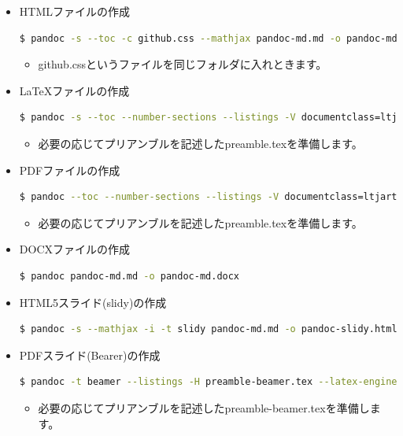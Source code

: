 \documentclass[]{ltjarticle}
\begin{document}
\begin{itemize}
\item
  HTMLファイルの作成

\begin{lstlisting}[language=bash]
$ pandoc -s --toc -c github.css --mathjax pandoc-md.md -o pandoc-md.html
\end{lstlisting}

  \begin{itemize}
  \itemsep1pt\parskip0pt
  \item
    github.cssというファイルを同じフォルダに入れときます。
  \end{itemize}
\item
  LaTeXファイルの作成

\begin{lstlisting}[language=bash]
$ pandoc -s --toc --number-sections --listings -V documentclass=ltjarticle -H preamble.tex pandoc-md.md -o pandoc-md.tex
\end{lstlisting}

  \begin{itemize}
  \itemsep1pt\parskip0pt
  \item
    必要の応じてプリアンブルを記述したpreamble.texを準備します。
  \end{itemize}
\item
  PDFファイルの作成

\begin{lstlisting}[language=bash]
$ pandoc --toc --number-sections --listings -V documentclass=ltjarticle -H preamble.tex --latex-engine=lualatex -H preamble.tex pandoc-md.md -o pandoc-md.pdf
\end{lstlisting}

  \begin{itemize}
  \itemsep1pt\parskip0pt
  \item
    必要の応じてプリアンブルを記述したpreamble.texを準備します。
  \end{itemize}
\item
  DOCXファイルの作成

\begin{lstlisting}[language=bash]
$ pandoc pandoc-md.md -o pandoc-md.docx
\end{lstlisting}
\item
  HTML5スライド(slidy)の作成

\begin{lstlisting}[language=bash]
$ pandoc -s --mathjax -i -t slidy pandoc-md.md -o pandoc-slidy.html
\end{lstlisting}
\item
  PDFスライド(Bearer)の作成

\begin{lstlisting}[language=bash]
$ pandoc -t beamer --listings -H preamble-beamer.tex --latex-engine=lualatex pandoc-md.md -o pandoc-beamer.pdf
\end{lstlisting}

  \begin{itemize}
  \itemsep1pt\parskip0pt
  \item
    必要の応じてプリアンブルを記述したpreamble-beamer.texを準備します。
  \end{itemize}
\end{itemize}
\end{document}
